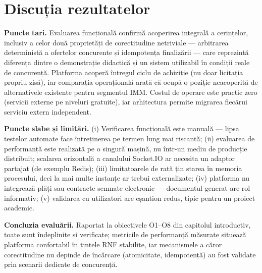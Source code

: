 \section{Discuția rezultatelor}
\label{sec:discutie}

\textbf{Puncte tari.} Evaluarea funcțională confirmă acoperirea integrală a cerințelor, inclusiv a celor două proprietăți de corectitudine netriviale --- arbitrarea deterministă a ofertelor concurente și idempotența finalizării --- care reprezintă diferența dintre o demonstrație didactică și un sistem utilizabil în condiții reale de concurență. Platforma acoperă întregul ciclu de achiziție (nu doar licitația propriu-zisă), iar comparația operațională arată că ocupă o poziție neacoperită de alternativele existente pentru segmentul IMM. Costul de operare este practic zero (servicii externe pe niveluri gratuite), iar arhitectura permite migrarea fiecărui serviciu extern independent.

\textbf{Puncte slabe și limitări.} (i) Verificarea funcțională este manuală --- lipsa testelor automate face întreținerea pe termen lung mai riscantă; (ii) evaluarea de performanță este realizată pe o singură mașină, nu într-un mediu de producție distribuit; scalarea orizontală a canalului Socket.IO ar necesita un adaptor partajat (de exemplu Redis); (iii) limitatoarele de rată țin starea în memoria procesului, deci la mai multe instanțe ar trebui externalizate; (iv) platforma nu integrează plăți sau contracte semnate electronic --- documentul generat are rol informativ; (v) validarea cu utilizatori are eșantion redus, tipic pentru un proiect academic.

\textbf{Concluzia evaluării.} Raportat la obiectivele O1--O8 din capitolul introductiv, toate sunt îndeplinite și verificate; metricile de performanță măsurate  situează platforma confortabil în țintele RNF stabilite, iar mecanismele a căror corectitudine nu depinde de încărcare (atomicitate, idempotență) au fost validate prin scenarii dedicate de concurență.
